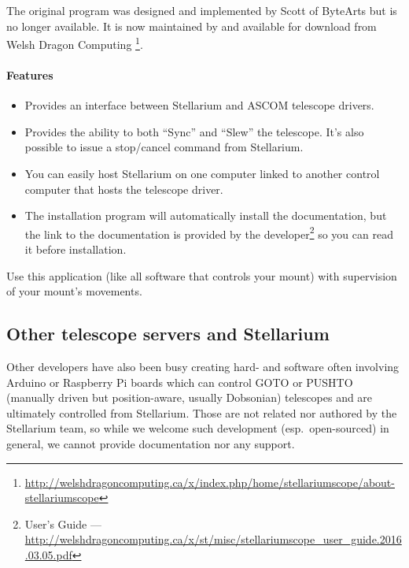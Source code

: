 The original  program was designed and implemented by Scott of ByteArts
but is no longer available. 
It is now maintained by and available for download from Welsh Dragon Computing
\footnote{\url{http://welshdragoncomputing.ca/x/index.php/home/stellariumscope/about-stellariumscope}}.

\paragraph{Features}
\begin{itemize}
\item Provides an interface between Stellarium and ASCOM telescope drivers.
\item Provides the ability to both ``Sync'' and ``Slew'' the
  telescope. It's also possible to issue a stop/cancel command from
  Stellarium.
\item You can easily host Stellarium on one computer linked to another
  control computer that hosts the telescope driver.
\item The installation program will automatically install the
  documentation, but the link to the documentation is provided
  by the developer\footnote{ User's Guide --- \url{http://welshdragoncomputing.ca/x/st/misc/stellariumscope_user_guide.2016.03.05.pdf}} so you can read it before installation.
\end{itemize}


Use this application (like all software that
controls your mount) with supervision of your mount's movements.

\subsection{Other telescope servers and Stellarium}
\label{sec:plugins:TelescopeControl:Other}

Other developers have also been busy creating hard- and software often
involving Arduino or Raspberry Pi boards which can control GOTO or
PUSHTO (manually driven but position-aware, usually Dobsonian)
telescopes and are ultimately controlled from Stellarium. Those are
not related nor authored by the Stellarium team, so while we welcome
such development (esp.\ open-sourced) in general, we cannot provide
documentation nor any support.

